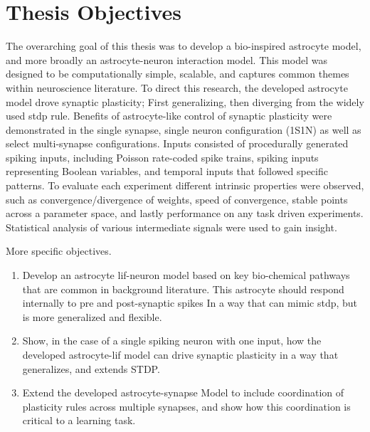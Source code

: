 \section{Thesis Objectives}
The overarching goal of this thesis was to develop a bio-inspired astrocyte
model, and more broadly an astrocyte-neuron interaction model. This model was
designed to be computationally simple, scalable, and captures common themes
within neuroscience literature. To direct this research, the developed astrocyte
model drove synaptic plasticity; First generalizing, then diverging from the
widely used \gls{stdp} rule. Benefits of astrocyte-like control of synaptic plasticity
were demonstrated in the single synapse, single neuron configuration (1S1N) as
well as select multi-synapse configurations. Inputs consisted of procedurally
generated spiking inputs, including Poisson rate-coded spike trains, spiking
inputs representing Boolean variables, and temporal inputs that followed
specific patterns. To evaluate each experiment different intrinsic properties
were observed, such as convergence/divergence of weights, speed of convergence,
stable points across a parameter space, and lastly performance on any task
driven experiments. Statistical analysis of various intermediate signals were
used to gain insight.

More specific objectives.
\begin{enumerate}
\item Develop an astrocyte \gls{lif}-neuron model based on key bio-chemical
  pathways that are common in background literature. This astrocyte should
  respond internally to pre and post-synaptic spikes In a way that can mimic
  \gls{stdp}, but is more generalized and flexible.

  \item Show, in the case of a single spiking neuron with one input, how the
    developed astrocyte-\gls{lif} model can drive synaptic plasticity in a way that
    generalizes, and extends STDP.

  \item Extend the developed astrocyte-synapse Model to include coordination of
    plasticity rules across multiple synapses, and show how this coordination is
    critical to a learning task.

\end{enumerate}
